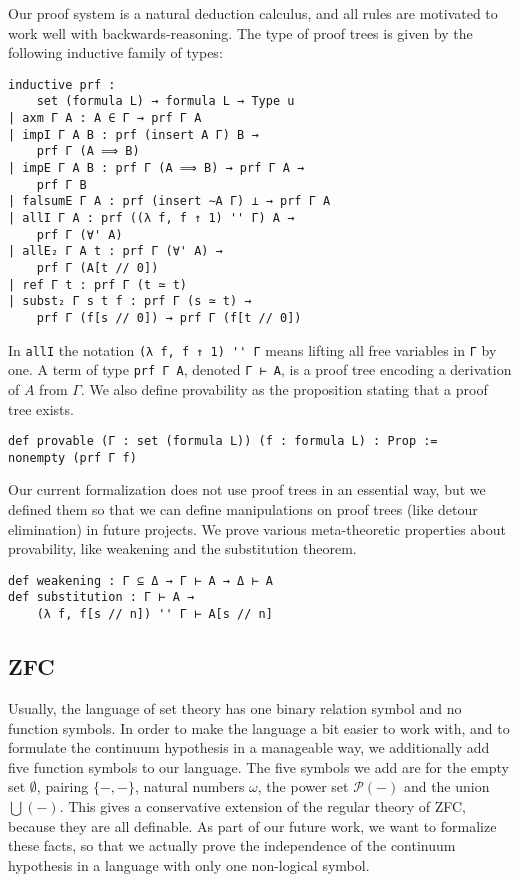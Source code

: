 \documentclass[sigplan,10pt,review, anonymous]{acmart}
\newcommand{\lil}{\lstinline}
\theoremstyle{definition}
\begin{document}
Our proof system is a natural deduction calculus, and all rules are motivated to work well with backwards-reasoning. The type of proof trees is given by the following inductive family of types:
\begin{lstlisting}
inductive prf :
    set (formula L) → formula L → Type u
| axm Γ A : A ∈ Γ → prf Γ A
| impI Γ A B : prf (insert A Γ) B →
    prf Γ (A ⟹ B)
| impE Γ A B : prf Γ (A ⟹ B) → prf Γ A →
    prf Γ B
| falsumE Γ A : prf (insert ∼A Γ) ⊥ → prf Γ A
| allI Γ A : prf ((λ f, f ↑ 1) '' Γ) A →
    prf Γ (∀' A)
| allE₂ Γ A t : prf Γ (∀' A) →
    prf Γ (A[t // 0])
| ref Γ t : prf Γ (t ≃ t)
| subst₂ Γ s t f : prf Γ (s ≃ t) →
    prf Γ (f[s // 0]) → prf Γ (f[t // 0])
\end{lstlisting}
In \lil{allI} the notation \lil{(λ f, f ↑ 1) '' Γ} means lifting all free variables in \lil{Γ} by one.
A term of type \lil{prf Γ A}, denoted \lil{Γ ⊢ A}, is a proof tree encoding a derivation of $A$ from $\Gamma$.
We also define provability as the proposition stating that a proof tree exists.
\begin{lstlisting}
def provable (Γ : set (formula L)) (f : formula L) : Prop :=
nonempty (prf Γ f)
\end{lstlisting}
Our current formalization does not use proof trees in an essential way, but we defined them so that we can define manipulations on proof trees (like detour elimination) in future projects.
We prove various meta-theoretic properties about provability, like weakening and the substitution theorem.
\begin{lstlisting}
def weakening : Γ ⊆ Δ → Γ ⊢ A → Δ ⊢ A
def substitution : Γ ⊢ A →
    (λ f, f[s // n]) '' Γ ⊢ A[s // n]
\end{lstlisting}
\subsection{ZFC}
\label{subsection:fol:zfc}

Usually, the language of set theory has one binary relation symbol and no function symbols.
In order to make the language a bit easier to work with, and to formulate the continuum hypothesis in a manageable way, we additionally add five function symbols to our language.
The five symbols we add are for the empty set \(\emptyset\), pairing \(\{{-},{-}\}\), natural numbers \(\omega\), the power set \(\mathcal{P}({-})\) and the union \(\bigcup({-})\).
This gives a conservative extension of the regular theory of ZFC, because they are all definable.
As part of our future work, we want to formalize these facts, so that we actually prove the independence of the continuum hypothesis in a language with only one non-logical symbol.
\end{document}
